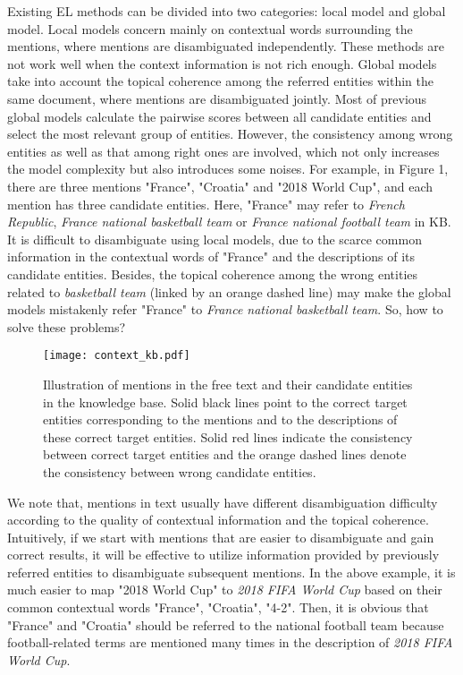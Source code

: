 \documentclass[sigconf]{acmart}
\begin{document}
Existing EL methods can be divided into two categories: local model and global model. Local models concern mainly on contextual words surrounding the mentions, where mentions are disambiguated independently. These methods are not work well when the context information is not rich enough. Global models take into account the topical coherence among the referred entities within the same document, where mentions are disambiguated jointly. Most of previous global models \cite{GaneaH17, TitovL18a, NguyenFRHGS16} calculate the pairwise scores between all candidate entities and select the most relevant group of entities. However, the consistency among wrong entities as well as that among right ones are involved, which not only increases the model complexity but also introduces some noises. For example, in Figure 1, there are three mentions "France", "Croatia" and "2018 World Cup", and each mention has three candidate entities. Here, "France" may refer to \emph{French Republic}, \emph{France national basketball team} or \emph{France national football team} in KB. It is difficult to disambiguate using local models, due to the scarce common information in the contextual words of "France" and the descriptions of its candidate entities. Besides, the topical coherence among the wrong entities related to \emph{basketball team} (linked by an orange dashed line) may make the global models mistakenly refer "France" to \emph{France national basketball team}. So, how to solve these problems?

\begin{figure*}[t]
\centering
\texttt{[image: context\_kb.pdf]}
\caption{Illustration of mentions in the free text and their candidate entities in the knowledge base. Solid black lines point to the correct target entities corresponding to the mentions and to the descriptions of these correct target entities. Solid red lines indicate the consistency between correct target entities and the orange dashed lines denote the consistency between wrong candidate entities.}
\end{figure*}

We note that, mentions in text usually have different disambiguation difficulty according to the quality of contextual information and the topical coherence. Intuitively, if we start with mentions that are easier to disambiguate and gain correct results, it will be effective to utilize information provided by previously referred entities to disambiguate subsequent mentions. In the above example, it is much easier to map "2018 World Cup" to \emph{2018 FIFA World Cup} based on their common contextual words "France", "Croatia", "4-2". Then, it is obvious that "France" and "Croatia" should be referred to the national football team because football-related terms are mentioned many times in the description of \emph{2018 FIFA World Cup}.
\end{document}
